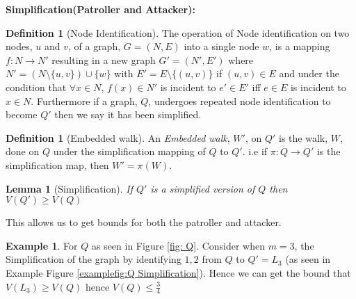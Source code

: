 \documentclass[a4paper,10pt]{article}
\newtheorem{lemma}[theorem]{Lemma}
\theoremstyle{definition}
\newtheorem{definition}[theorem]{Definition}
\theoremstyle{definition}
\newtheorem{example}[theorem]{Example}
\theoremstyle{remark}
\theoremstyle{definition}
\begin{document}
\textbf{Simplification(Patroller and Attacker):}

\begin{definition}[Node Identification]
The operation of Node identification on two nodes, $u$ and $v$, of a graph, $G=(N,E)$ into a single node $w$, is a mapping $f:N \rightarrow N'$ resulting in a new graph $G'=(N',E')$ where $N'=(N \setminus  \{u,v\}) \cup \{w\}$ with $E'=E \setminus \{(u,v)\}$ if $(u,v) \in E$ and under the condition that $\forall x \in N$, $f(x) \in N'$ is incident to $e' \in E'$ iff $e \in E$ is incident to $x \in N$.
Furthermore if a graph, $Q$, undergoes repeated node identification to become $Q'$ then we say it has been simplified. 
\end{definition}

\begin{definition}[Embedded walk]
An \textit{Embedded walk}, $W'$, on $Q'$ is the walk, $W$, done on $Q$ under the simplification mapping of $Q$ to $Q'$. i.e if $\pi :Q \rightarrow Q'$ is the simplification map, then $W'=\pi (W)$.
\end{definition}

\begin{lemma}[Simplification]
If $Q'$ is a simplified version of $Q$ then $V(Q') \geq V(Q)$
\end{lemma}

This allows us to get bounds for both the patroller and attacker.

\begin{example}
For $Q$ as seen in Figure \ref{fig: Q}. Consider when $m=3$, the Simplification of the graph by identifying $1,2$ from $Q$ to $Q'=L_{3}$ (as seen in Example Figure \ref{examplefig:Q Simplification}). Hence we can get the bound that $V(L_{3}) \geq  V(Q)$ hence $V(Q) \leq \frac{3}{4} $
\end{example}
\end{document}
